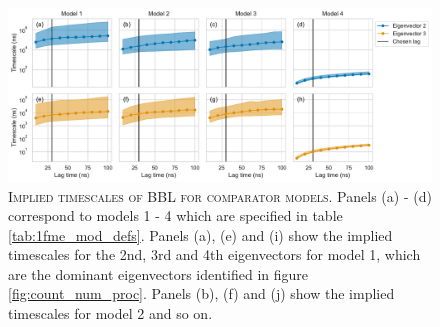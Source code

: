 \documentclass{article}
\begin{document}
\begin{figure}[h]
    \centering
    \includegraphics[width=1\textwidth]{figures/model_comparision_its/2wav.pdf}
    \caption{\textsc{Implied timescales of BBL for comparator models.} Panels (a) - (d) correspond to models 1 - 4 which are specified in table \ref{tab:1fme_mod_defs}. Panels (a), (e) and (i) show the implied timescales for the 2nd, 3rd and 4th eigenvectors for model 1, which are the dominant eigenvectors identified in figure \ref{fig:count_num_proc}.  Panels (b), (f) and (j) show the implied timescales for model 2 and so on.}
    \label{fig:2wav_its}
\end{figure}
\end{document}
